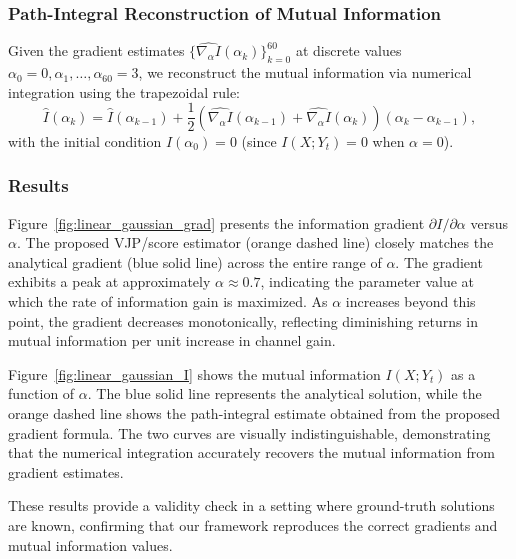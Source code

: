 \documentclass[conference]{IEEEtran}
\begin{document}
\subsubsection{Path-Integral Reconstruction of Mutual Information}

Given the gradient estimates 
$\{\widehat{\nabla_\alpha I}(\alpha_k)\}_{k=0}^{60}$ at
discrete values $\alpha_0 = 0, \alpha_1, \ldots, \alpha_{60} = 3$, we reconstruct the
mutual information via numerical integration using the trapezoidal rule:
\begin{equation}
\widehat{I}(\alpha_k) = \widehat{I}(\alpha_{k-1}) + \frac{1}{2} \left(
\widehat{\nabla_\alpha I}(\alpha_{k-1}) + \widehat{\nabla_\alpha I}(\alpha_k) \right)
(\alpha_k - \alpha_{k-1}),
\end{equation}
with the initial condition $\widehat{I}(\alpha_0) = 0$ (since $I(X; Y_t) = 0$ when
$\alpha = 0$).

\subsubsection{Results}

Figure~\ref{fig:linear_gaussian_grad} presents the information gradient $\partial I /
\partial \alpha$ versus $\alpha$. The proposed VJP/score estimator (orange
dashed line) closely matches the analytical gradient (blue solid line) across the
entire range of $\alpha$. The gradient exhibits a peak at approximately $\alpha \approx
0.7$, indicating the parameter value at which the rate of information gain is
maximized. As $\alpha$ increases beyond this point, the gradient decreases
monotonically, reflecting diminishing returns in mutual information per unit increase
in channel gain.

Figure~\ref{fig:linear_gaussian_I} shows the mutual information $I(X; Y_t)$ as a
function of $\alpha$. The blue solid line represents the analytical solution, while the
orange dashed line shows the path-integral estimate obtained from the proposed
gradient formula. The two curves are visually indistinguishable, demonstrating that the
numerical integration accurately recovers the mutual information from gradient
estimates.

These results provide a validity check in a setting where ground-truth solutions are
known, confirming that our framework reproduces the correct gradients and mutual
information values. 

\end{document}
